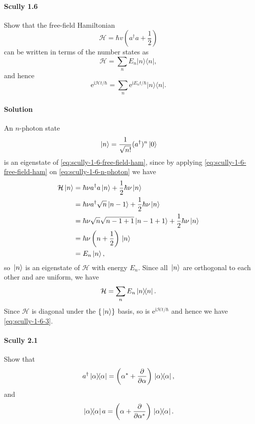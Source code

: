 \documentclass[hyperref, a4paper]{article}
\newcommand*{\ii}{\mathrm{i}}
\newcommand*{\ee}{\mathrm{e}}
\newcommand{\mathscr}{\mathcal}
\begin{document}
\paragraph{Scully 1.6} Show that the free-field Hamiltonian
\begin{equation}
    \mathscr{H}=\hbar v\left(a^{\dagger} a+\frac{1}{2}\right)
    \label{eq:scully-1-6-free-field-ham}
\end{equation}
can be written in terms of the number states as
\[
\mathscr{H}=\sum_{n} E_{n}|n\rangle\langle n|,
\]
and hence
\begin{equation}
    \ee^{\ii \mathscr{H} t / \hbar}=\sum_{n} \ee^{\ii E_{n} t / \hbar}|n\rangle\langle n|.
    \label{eq:scully-1-6-3}
\end{equation}

\paragraph{Solution} An $n$-photon state
\begin{equation}
    \ket*{n} = \frac{1}{\sqrt{n!}} (a^\dagger)^n \ket*{0}
    \label{eq:scully-1-6-n-photon}
\end{equation}
is an eigenstate of \eqref{eq:scully-1-6-free-field-ham}, since by applying \eqref{eq:scully-1-6-free-field-ham} on \eqref{eq:scully-1-6-n-photon} we have
\[
    \begin{aligned}
        \mathcal{H} \ket*{n} &= \hbar \nu a^\dagger a \ket*{n} + \frac{1}{2} \hbar \nu \ket*{n} \\
        &= \hbar \nu a^\dagger \sqrt{n} \ket*{n-1} + \frac{1}{2} \hbar \nu \ket*{n} \\
        &= \hbar \nu \sqrt{n} \sqrt{n-1+1} \ket*{n-1+1} + \frac{1}{2} \hbar \nu \ket*{n} \\
        &= \hbar \nu \left( n + \frac{1}{2} \right) \ket*{n} \\
        &= E_n \ket*{n},
    \end{aligned}
\]
so $\ket*{n}$ is an eigenstate of $\mathcal{H}$ with energy $E_n$.
Since all $\ket*{n}$ are orthogonal to each other and are uniform, we have
\begin{equation}
    \mathcal{H} = \sum_n E_n \dyad*{n}.
\end{equation}
Since $\mathcal{H}$ is diagonal under the $\{\ket*{n}\}$ basis, so is $\ee^{\ii \mathcal{H} t / \hbar}$ and hence we have \eqref{eq:scully-1-6-3}.

\paragraph{Scully 2.1} Show that
\begin{equation}
    a^\dagger \dyad*{\alpha} = \left( \alpha^{*}+\frac{\partial}{\partial \alpha} \right) \dyad*{\alpha},
    \label{eq:scully-2-1-1}
\end{equation}
and
\begin{equation}
    \dyad*{\alpha} a = \left(\alpha+\frac{\partial}{\partial \alpha^{*}}\right) \dyad*{\alpha}.
    \label{eq:scully-2-1-2}
\end{equation}
\end{document}

